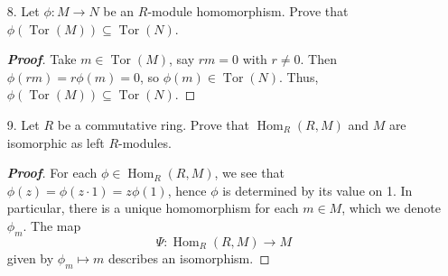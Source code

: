 \documentclass[12pt,leqno]{book}
\theoremstyle{definition}
\newcommand{\Hom}{\operatorname{Hom}}
\newcommand{\Tor}{\operatorname{Tor}}
\newenvironment{Proof}{\begin{proof}[\textnormal{\textbf{Proof}}]}{\end{proof}}
\begin{document}
\begin{enumerate}
 \item [8.] Let $\phi:M\to N$ be an $R$-module homomorphism. Prove that $\phi(\Tor(M))\subseteq\Tor(N)$.

\begin{Proof}
 Take $m\in\Tor(M)$, say $rm=0$ with $r\not=0$. Then $\phi(rm)=r\phi(m)=0$, so $\phi(m)\in\Tor(N)$. Thus, $\phi(\Tor(M))\subseteq\Tor(N)$.
\end{Proof}

 \item [9.] Let $R$ be a commutative ring. Prove that $\Hom_R(R,M)$ and $M$ are isomorphic as left $R$-modules.

\begin{Proof}
 For each $\phi\in\Hom_R(R,M)$, we see that $\phi(z)=\phi(z\cdot1)=z\phi(1)$, hence $\phi$ is determined by its value on 1. In particular, there is a unique homomorphism for each $m\in M$, which we denote $\phi_m$. The map \[\Psi:\Hom_R(R,M)\to M\] given by $\phi_m\mapsto m$ describes an isomorphism.
\end{Proof}

\end{enumerate}
\end{document}
